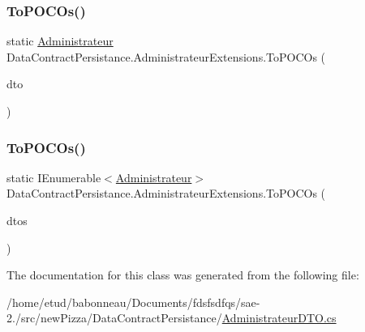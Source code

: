 \subsubsection{\texorpdfstring{To\+P\+O\+C\+Os()}{ToPOCOs()}\hspace{0.1cm}{\footnotesize\ttfamily [1/2]}}
{\footnotesize\ttfamily static \hyperlink{classModele_1_1Administrateur}{Administrateur} Data\+Contract\+Persistance.\+Administrateur\+Extensions.\+To\+P\+O\+C\+Os (\begin{DoxyParamCaption}\item[{this \hyperlink{classDataContractPersistance_1_1AdministrateurDTO}{Administrateur\+D\+TO}}]{dto }\end{DoxyParamCaption})\hspace{0.3cm}{\ttfamily [static]}}

\mbox{\label{classDataContractPersistance_1_1AdministrateurExtensions_abe157cf77951cd35db30b2af2222e93a}} 
\subsubsection{\texorpdfstring{To\+P\+O\+C\+Os()}{ToPOCOs()}\hspace{0.1cm}{\footnotesize\ttfamily [2/2]}}
{\footnotesize\ttfamily static I\+Enumerable$<$\hyperlink{classModele_1_1Administrateur}{Administrateur}$>$ Data\+Contract\+Persistance.\+Administrateur\+Extensions.\+To\+P\+O\+C\+Os (\begin{DoxyParamCaption}\item[{this I\+Enumerable$<$ \hyperlink{classDataContractPersistance_1_1AdministrateurDTO}{Administrateur\+D\+TO} $>$}]{dtos }\end{DoxyParamCaption})\hspace{0.3cm}{\ttfamily [static]}}



The documentation for this class was generated from the following file\+:\begin{DoxyCompactItemize}
\item 
/home/etud/babonneau/\+Documents/fdsfsdfqs/sae-\/2./src/new\+Pizza/\+Data\+Contract\+Persistance/\hyperlink{AdministrateurDTO_8cs}{Administrateur\+D\+T\+O.\+cs}\end{DoxyCompactItemize}
